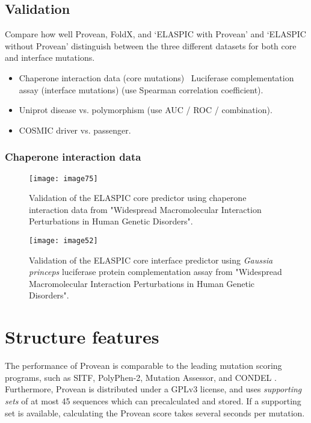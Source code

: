 \subsection{Validation}

Compare how well Provean, FoldX, and `ELASPIC with Provean' and `ELASPIC without Provean' distinguish between the three different datasets for both core and interface mutations.

\begin{itemize}
\item Chaperone interaction data (core mutations) \ Luciferase complementation assay (interface mutations) (use Spearman correlation coefficient).
\item Uniprot disease vs. polymorphism (use AUC / ROC / combination).
\item COSMIC driver vs. passenger.
\end{itemize}







\subsubsection{Chaperone interaction data}

\begin{figure}[H]
	\centering
	\texttt{[image: image75]}
	\caption[Core Validation]{Validation of the ELASPIC core predictor using chaperone interaction data from "Widespread Macromolecular Interaction Perturbations in Human Genetic Disorders".}
\end{figure}


\begin{figure}[H]
	\centering
	\texttt{[image: image52]}
	\caption[Interface Validation]{Validation of the ELASPIC core interface predictor using \textit{Gaussia princeps} luciferase protein complementation assay from "Widespread Macromolecular Interaction Perturbations in Human Genetic Disorders".}
\end{figure}









\section{Structure features}

The performance of Provean is comparable to the leading mutation scoring programs, such as SITF, PolyPhen-2, Mutation Assessor, and CONDEL \cite{choi_predicting_2012}. Furthermore, Provean is distributed under a GPLv3 license, and uses \textit{supporting sets} of at most 45 sequences which can precalculated and stored. If a supporting set is available, calculating the Provean score takes several seconds per mutation.

